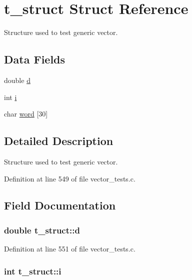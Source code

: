 \hypertarget{structt__struct}{\section{t\-\_\-struct \-Struct \-Reference}
\label{structt__struct}
}


\-Structure used to test generic vector.  


\subsection*{\-Data \-Fields}
\begin{DoxyCompactItemize}
\item 
double \hyperlink{structt__struct_a2029e2f2da88d23bcc9fa6ba45f51bf4}{d}
\item 
int \hyperlink{structt__struct_a488184c86cae0be164cfb634882b8f7a}{i}
\item 
char \hyperlink{structt__struct_ab5b290b572fc4036f1e5efc671098c7f}{word} \mbox{[}30\mbox{]}
\end{DoxyCompactItemize}


\subsection{\-Detailed \-Description}
\-Structure used to test generic vector. 



\-Definition at line 549 of file vector\-\_\-tests.\-c.



\subsection{\-Field \-Documentation}
\hypertarget{structt__struct_a2029e2f2da88d23bcc9fa6ba45f51bf4}{
\subsubsection[{d}]{\setlength{\rightskip}{0pt plus 5cm}double {\bf t\-\_\-struct\-::d}}}\label{structt__struct_a2029e2f2da88d23bcc9fa6ba45f51bf4}


\-Definition at line 551 of file vector\-\_\-tests.\-c.

\hypertarget{structt__struct_a488184c86cae0be164cfb634882b8f7a}{
\subsubsection[{i}]{\setlength{\rightskip}{0pt plus 5cm}int {\bf t\-\_\-struct\-::i}}}\label{structt__struct_a488184c86cae0be164cfb634882b8f7a}


